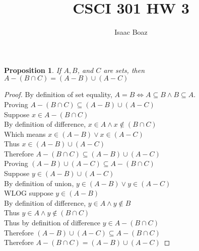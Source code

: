 \documentclass{article}
\title{\vspace{-5ex}CSCI 301 HW 3}
\author{Isaac Boaz}
\newtheorem*{theorem}{Proposition}
\begin{document}
\maketitle

\begin{theorem}
    If \(A, B\), and \(C\) are sets, then \(A- (B \cap C) = (A - B) \cup (A - C)\)
\end{theorem}

\begin{proof}
    By definition of set equality, \(A = B \iff A \subseteq B \land B \subseteq A\). \\
    Proving \(A-(B \cap C) \subseteq (A-B) \cup (A - C)\) \\
    Suppose \(x \in A-(B \cap C)\) \\
    By definition of difference, \(x \in A \land x \notin (B \cap C)\) \\
    Which means \(x \in (A - B) \lor x \in (A - C)\) \\
    Thus \(x \in (A-B) \cup (A - C)\) \\
    Therefore \(A-(B \cap C) \subseteq (A-B) \cup (A - C)\) \\

    \noindent
    Proving \((A-B) \cup (A - C) \subseteq A-(B \cap C)\) \\
    Suppose \(y \in (A-B) \cup (A - C)\) \\
    By definition of union, \(y \in (A-B) \lor y \in (A - C)\) \\
    WLOG suppose \(y \in (A-B)\) \\
    By definition of difference, \(y \in A \land y \notin B\) \\
    Thus \(y \in A \land y \notin (B \cap C)\) \\
    Thus by definition of difference \(y \in A-(B \cap C)\) \\
    Therefore \((A-B) \cup (A - C) \subseteq A-(B \cap C)\) \\

    \noindent
    Therefore \(A-(B \cap C) = (A-B) \cup (A - C)\)
\end{proof}
\end{document}

